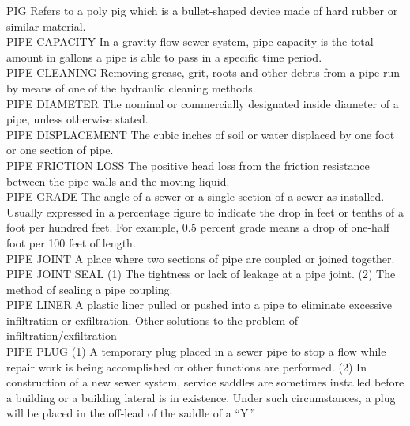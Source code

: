 \documentclass{article}
\begin{document}
PIG
Refers to a poly pig which is a bullet-shaped device made of hard rubber or similar material. 
\vspace{0.3cm}\\
PIPE CAPACITY
In a gravity-flow sewer system, pipe capacity is the total amount in gallons a pipe is able to pass in a specific time period. 
\vspace{0.3cm}\\
PIPE CLEANING
Removing grease, grit, roots and other debris from a pipe run by means of one of the hydraulic cleaning methods. 
\vspace{0.3cm}\\
PIPE DIAMETER
The nominal or commercially designated inside diameter of a pipe, unless otherwise stated. 
\vspace{0.3cm}\\
PIPE DISPLACEMENT
The cubic inches of soil or water displaced by one foot or one section of pipe. 
\vspace{0.3cm}\\
PIPE FRICTION LOSS
The positive head loss from the friction resistance between the pipe walls and the moving liquid.
\vspace{0.3cm}\\
PIPE GRADE
The angle of a sewer or a single section of a sewer as installed. Usually expressed in a percentage figure to indicate the drop in feet or tenths of a foot per hundred feet. For example, 0.5 percent grade means a drop of one-half foot per 100 feet of length. 
\vspace{0.3cm}\\
PIPE JOINT
A place where two sections of pipe are coupled or joined together. 
\vspace{0.3cm}\\
PIPE JOINT SEAL
(1) The tightness or lack of leakage at a pipe joint. (2) The method of sealing a pipe coupling. 
\vspace{0.3cm}\\
PIPE LINER
A plastic liner pulled or pushed into a pipe to eliminate excessive infiltration or exfiltration. Other solutions to the problem of infiltration/exfiltration 
\vspace{0.3cm}\\
PIPE PLUG
(1) A temporary plug placed in a sewer pipe to stop a flow while repair work is being accomplished or other functions are performed. (2) In construction of a new sewer system, service saddles are sometimes installed before a building or a building lateral is in existence. Under such circumstances, a plug will be placed in the off-lead of the saddle of a “Y.” 
\end{document}
